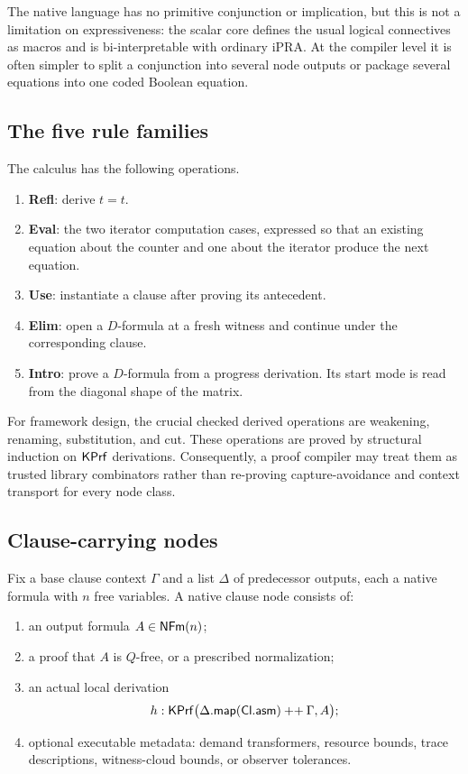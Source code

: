 The native language has no primitive conjunction or implication, but this is
not a limitation on expressiveness: the scalar core defines the usual logical
connectives as macros and is bi-interpretable with ordinary iPRA.  At the
compiler level it is often simpler to split a conjunction into several node
outputs or package several equations into one coded Boolean equation.

\subsection{The five rule families}

The calculus has the following operations.

\begin{enumerate}
\item \textbf{Refl}: derive \(t=t\).
\item \textbf{Eval}: the two iterator computation cases, expressed so that an
existing equation about the counter and one about the iterator produce the
next equation.
\item \textbf{Use}: instantiate a clause after proving its antecedent.
\item \textbf{Elim}: open a \(D\)-formula at a fresh witness and continue under
the corresponding clause.
\item \textbf{Intro}: prove a \(D\)-formula from a progress derivation.  Its
start mode is read from the diagonal shape of the matrix.
\end{enumerate}

For framework design, the crucial checked derived operations are weakening,
renaming, substitution, and cut.  These operations are proved by structural
induction on \(\mathsf{KPrf}\) derivations.  Consequently, a proof compiler may treat
them as trusted library combinators rather than re-proving capture-avoidance and
context transport for every node class.

\subsection{Clause-carrying nodes}

\begin{definition}
Fix a base clause context \(\Gamma\) and a list \(\Delta\) of predecessor
outputs, each a native formula with \(n\) free variables.  A native clause node
consists of:
\begin{enumerate}
\item an output formula \(A\in\mathsf{NFm}(n)\);
\item a proof that \(A\) is \(Q\)-free, or a prescribed 
normalization;
\item an actual local derivation
\[
   h:\mathsf{KPrf}\bigl(\Delta.\mathsf{map}(\mathsf{Cl}.\mathsf{asm})\mathbin{++}\Gamma,A\bigr);
\]
\item optional executable metadata: demand transformers, resource bounds,
trace descriptions, witness-cloud bounds, or observer tolerances.
\end{enumerate}
\end{definition}

